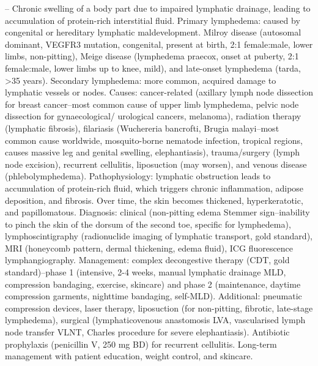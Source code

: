 -- Chronic swelling of a body part due to impaired lymphatic drainage, leading to accumulation of protein-rich interstitial fluid. Primary lymphedema: caused by congenital or hereditary lymphatic maldevelopment. Milroy disease (autosomal dominant, VEGFR3 mutation, congenital, present at birth, 2:1 female:male, lower limbs, non-pitting), Meige disease (lymphedema praecox, onset at puberty, 2:1 female:male, lower limbs up to knee, mild), and late-onset lymphedema (tarda, >35 years). Secondary lymphedema: more common, acquired damage to lymphatic vessels or nodes. Causes: cancer-related (axillary lymph node dissection for breast cancer--most common cause of upper limb lymphedema, pelvic node dissection for gynaecological/ urological cancers, melanoma), radiation therapy (lymphatic fibrosis), filariasis (Wuchereria bancrofti, Brugia malayi--most common cause worldwide, mosquito-borne nematode infection, tropical regions, causes massive leg and genital swelling, elephantiasis), trauma/surgery (lymph node excision), recurrent cellulitis, liposuction (may worsen), and venous disease (phlebolymphedema). Pathophysiology: lymphatic obstruction leads to accumulation of protein-rich fluid, which triggers chronic inflammation, adipose deposition, and fibrosis. Over time, the skin becomes thickened, hyperkeratotic, and papillomatous. Diagnosis: clinical (non-pitting edema Stemmer sign--inability to pinch the skin of the dorsum of the second toe, specific for lymphedema), lymphoscintigraphy (radionuclide imaging of lymphatic transport, gold standard), MRI (honeycomb pattern, dermal thickening, edema fluid), ICG fluorescence lymphangiography. Management: complex decongestive therapy (CDT, gold standard)--phase 1 (intensive, 2-4 weeks, manual lymphatic drainage MLD, compression bandaging, exercise, skincare) and phase 2 (maintenance, daytime compression garments, nighttime bandaging, self-MLD). Additional: pneumatic compression devices, laser therapy, liposuction (for non-pitting, fibrotic, late-stage lymphedema), surgical (lymphaticovenous anastomosis LVA, vascularised lymph node transfer VLNT, Charles procedure for severe elephantiasis). Antibiotic prophylaxis (penicillin V, 250 mg BD) for recurrent cellulitis. Long-term management with patient education, weight control, and skincare.


